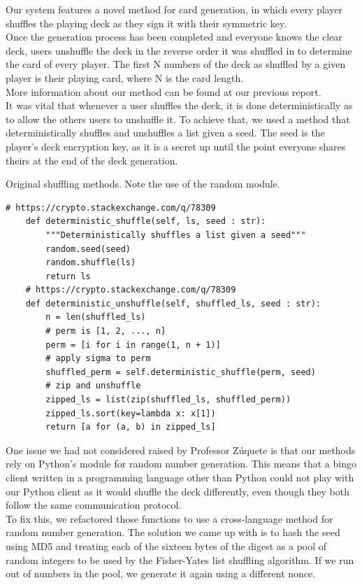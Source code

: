 \documentclass[11pt]{article}
\begin{document}
Our system features a novel method for card generation, in which every player shuffles the playing deck as they sign it with their symmetric key.\\
Once the generation process has been completed and everyone knows the clear deck, users unshuffle the deck in the reverse order it was shuffled in to determine the card of every player. The first N numbers of the deck as shuffled by a given player is their playing card, where N is the card length.\\
More information about our method can be found at our previous report.\\
It was vital that whenever a user shuffles the deck, it is done deterministically as to allow the others users to unshuffle it. To achieve that, we used a method that deterministically shuffles and unshuffles a list given a seed. The seed is the player’s deck encryption key, as it is a secret up until the point everyone shares theirs at the end of the deck generation.\\
\begin{Large}
Original shuffling methods. Note the use of the random module.
\end{Large}
\begin{lstlisting}[captionpos=b label=listing:sparql_getallindividuals,
   basicstyle=\ttfamily]
    # https://crypto.stackexchange.com/q/78309
    def deterministic_shuffle(self, ls, seed : str):
        """Deterministically shuffles a list given a seed""" 
        random.seed(seed)
        random.shuffle(ls)
        return ls
    # https://crypto.stackexchange.com/q/78309
    def deterministic_unshuffle(self, shuffled_ls, seed : str):
        n = len(shuffled_ls)
        # perm is [1, 2, ..., n]
        perm = [i for i in range(1, n + 1)]
        # apply sigma to perm
        shuffled_perm = self.deterministic_shuffle(perm, seed)
        # zip and unshuffle
        zipped_ls = list(zip(shuffled_ls, shuffled_perm))
        zipped_ls.sort(key=lambda x: x[1])
        return [a for (a, b) in zipped_ls]
\end{lstlisting}
One issue we had not considered raised by Professor Zúquete is that our methods rely on Python’s module for random number generation. This means that a bingo client written in a programming language other than Python could not play with our Python client as it would shuffle the deck differently, even though they both follow the same communication protocol.\\
To fix this, we refactored those functions to use a cross-language method for random number generation. The solution we came up with is to hash the seed using MD5 and treating each of the sixteen bytes of the digest as a pool of random integers to be used by the Fisher-Yates list shuffling algorithm. If we run out of numbers in the pool, we generate it again using a different nonce.\\
\end{document}
